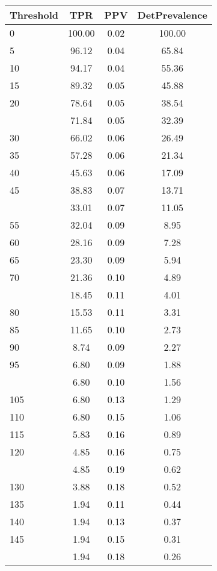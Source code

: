 \begin{table}[ht]
\centering
\begin{tabular}{lccc}
  \toprule
Threshold & TPR & PPV & DetPrevalence \\ 
  \midrule
0 & 100.00 & 0.02 & 100.00 \\ 
  5 & 96.12 & 0.04 & 65.84 \\ 
  10 & 94.17 & 0.04 & 55.36 \\ 
  15 & 89.32 & 0.05 & 45.88 \\ 
  20 & 78.64 & 0.05 & 38.54 \\ 
   \addlinespace
25 & 71.84 & 0.05 & 32.39 \\ 
  30 & 66.02 & 0.06 & 26.49 \\ 
  35 & 57.28 & 0.06 & 21.34 \\ 
  40 & 45.63 & 0.06 & 17.09 \\ 
  45 & 38.83 & 0.07 & 13.71 \\ 
   \addlinespace
50 & 33.01 & 0.07 & 11.05 \\ 
  55 & 32.04 & 0.09 & 8.95 \\ 
  60 & 28.16 & 0.09 & 7.28 \\ 
  65 & 23.30 & 0.09 & 5.94 \\ 
  70 & 21.36 & 0.10 & 4.89 \\ 
   \addlinespace
75 & 18.45 & 0.11 & 4.01 \\ 
  80 & 15.53 & 0.11 & 3.31 \\ 
  85 & 11.65 & 0.10 & 2.73 \\ 
  90 & 8.74 & 0.09 & 2.27 \\ 
  95 & 6.80 & 0.09 & 1.88 \\ 
   \addlinespace
100 & 6.80 & 0.10 & 1.56 \\ 
  105 & 6.80 & 0.13 & 1.29 \\ 
  110 & 6.80 & 0.15 & 1.06 \\ 
  115 & 5.83 & 0.16 & 0.89 \\ 
  120 & 4.85 & 0.16 & 0.75 \\ 
   \addlinespace
125 & 4.85 & 0.19 & 0.62 \\ 
  130 & 3.88 & 0.18 & 0.52 \\ 
  135 & 1.94 & 0.11 & 0.44 \\ 
  140 & 1.94 & 0.13 & 0.37 \\ 
  145 & 1.94 & 0.15 & 0.31 \\ 
   \addlinespace
150 & 1.94 & 0.18 & 0.26 \\ 

\end{tabular}
\end{table}

